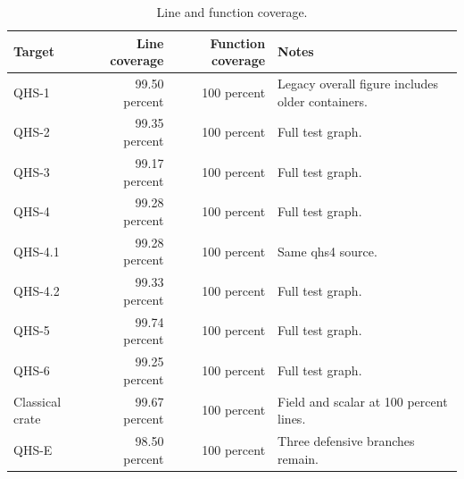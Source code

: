 \documentclass[11pt,a4paper]{article}
\theoremstyle{remark}
\begin{document}
\begin{table}[ht]
\centering
\caption{Line and function coverage.}
\label{tab:coverage}
\small
\begin{tabularx}{\textwidth}{@{}l r r X@{}}
\toprule
Target & Line coverage & Function coverage & Notes\\
\midrule
QHS-1 & 99.50 percent & 100 percent & Legacy overall figure includes older containers.\\
QHS-2 & 99.35 percent & 100 percent & Full test graph.\\
QHS-3 & 99.17 percent & 100 percent & Full test graph.\\
QHS-4 & 99.28 percent & 100 percent & Full test graph.\\
QHS-4.1 & 99.28 percent & 100 percent & Same qhs4 source.\\
QHS-4.2 & 99.33 percent & 100 percent & Full test graph.\\
QHS-5 & 99.74 percent & 100 percent & Full test graph.\\
QHS-6 & 99.25 percent & 100 percent & Full test graph.\\
Classical crate & 99.67 percent & 100 percent & Field and scalar at 100 percent lines.\\
QHS-E & 98.50 percent & 100 percent & Three defensive branches remain.\\
\bottomrule
\end{tabularx}
\end{table}
\end{document}
